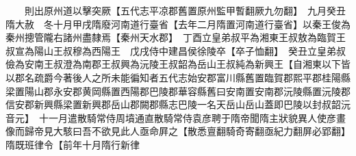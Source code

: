 　　則出原州道以擊突厥【五代志平凉郡舊置原州監甲暫翻厥九勿翻】　九月癸丑隋大赦　冬十月甲戌隋廢河南道行臺省【去年二月隋置河南道行臺省】以秦王俊為秦州摠管隴右諸州盡隸焉【秦州天水郡】　丁酉立皇弟叔平為湘東王叔敖為臨賀王叔宣為陽山王叔穆為西陽王　戊戌侍中建昌侯徐陵卒【卒子恤翻】　癸丑立皇弟叔儉為安南王叔澄為南郡王叔興為沅陵王叔韶為岳山王叔純為新興王【自湘東以下皆以郡名疏爵今著後人之所未能徧知者五代志始安郡富川縣舊置臨賀郡熙平郡桂陽縣梁置陽山郡永安郡黄岡縣置西陽郡巴陵郡華容縣舊曰安南置安南郡沅陵縣置沅陵郡信安郡新興縣梁置新興郡岳山郡闕郡縣志巴陵一名天岳山岳山蓋即巴陵以封叔韶沅音元】　十一月遣散騎常侍周墳通直散騎常侍袁彦聘于隋帝聞隋主狀貌異人使彦畫像而歸帝見大駭曰吾不欲見此人亟命屛之【散悉亶翻騎奇寄翻亟紀力翻屏必郢翻】　隋既班律令【前年十月隋行新律